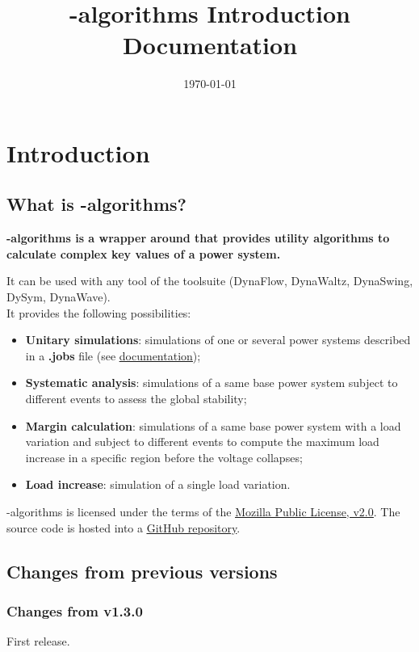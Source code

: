 \documentclass[a4paper, 12pt]{report}
\begin{document}
\title{\Dynawo-algorithms Introduction Documentation}
\date\today

\maketitle
\tableofcontents

\chapter{Introduction}

\section{What is \Dynawo-algorithms?}

\textbf{\Dynawo-algorithms is a wrapper around  \href{https://dynawo.github.io/}{\underline{\Dynawo}} 
that provides utility algorithms to calculate complex key values of a power system.} 

It can be used with any tool of the \Dynawo toolsuite (DynaFlow, DynaWaltz, DynaSwing, DySym, DynaWave).\\

It provides the following possibilities:
\begin{itemize}
  \item \textbf{Unitary simulations}: simulations of one or several power systems described in a \textbf{.jobs} file 
  (see \href{https://github.com/dynawo/dynawo/releases/download/v1.3.0/DynawoDocumentation.pdf}{\underline{\Dynawo documentation}});
  \item \textbf{Systematic analysis}: simulations of a same base power system subject to different events to assess the global stability;
  \item \textbf{Margin calculation}: simulations of a same base power system with a load variation and subject to different events to compute 
  the maximum load increase in a specific region before the voltage collapses;
  \item \textbf{Load increase}: simulation of a single load variation.
\end{itemize}

\Dynawo-algorithms is licensed under the terms of the \href{http://mozilla.org/MPL/2.0}{\underline{Mozilla Public License, v2.0}}.
The source code is hosted into a \href{https://github.com/dynawo/dynawo-algorithms} {\underline{GitHub repository}}. \\

\section{Changes from previous versions}

\subsection{Changes from v1.3.0}
First release.
\end{document}
